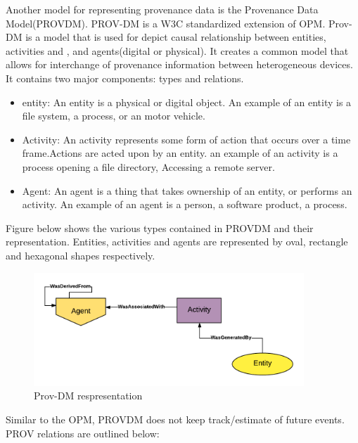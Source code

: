 Another model for representing provenance data is the Provenance Data Model(PROV\-DM). PROV-DM is a W3C standardized extension of OPM. Prov-DM is a model that is used for depict causal relationship between entities, activities and , and agents(digital or physical).  It creates a common model that allows for interchange of provenance information between heterogeneous devices. It contains two major components: types and relations. 


\begin{itemize}

\item entity: An entity is a physical or digital object. An example of an entity is a file system, a process, or an motor vehicle.

\item Activity: An activity represents some form of action that occurs over a time frame.Actions are acted upon by an entity. an example of an activity is a process opening a file directory, Accessing a remote server.

\item Agent: An agent is a thing that takes ownership of an entity, or performs an activity. An example of an agent is a person, a software product, a process.
\end{itemize}

Figure below shows the various types contained in PROV\-DM and their representation. Entities, activities and agents are represented by oval, rectangle and hexagonal shapes respectively.

\begin{figure}[h]
\begin{center}

\includegraphics[width=4.0in]{prov_dm_1.PNG}
\end{center}
\caption{Prov-DM respresentation }
\end{figure}

Similar to the OPM, PROV\-DM does not keep track/estimate of future events. PROV relations are outlined below:



